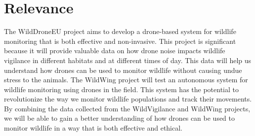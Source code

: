 \documentclass[final,5p,times,twocolumn]{elsarticle}
\begin{document}
\section{Relevance}
The WildDroneEU project aims to develop a drone-based system for wildlife monitoring that is both effective and non-invasive.
This project is significant because it will provide valuable data on how drone noise impacts wildlife vigilance 
in different habitats and at different times of day.
This data will help us understand how drones can be used to monitor wildlife without causing undue stress to the animals.
The WildWing project will test an autonomous system for wildlife monitoring using drones in the field.
This system has the potential to revolutionize the way we monitor wildlife populations and track their movements.
By combining the data collected from the WildVigilance and WildWing projects, we will be able to gain a better 
understanding of how drones can be used to monitor wildlife in a way that is both effective and ethical.
\end{document}
